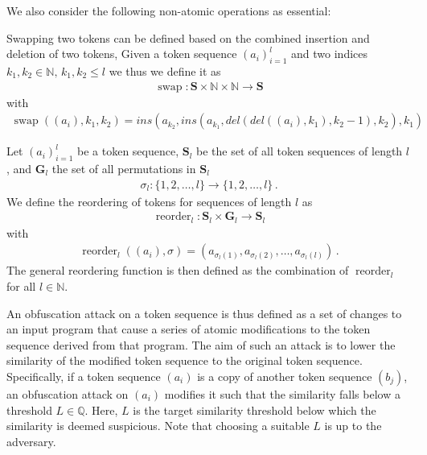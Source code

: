 We also consider the following non-atomic operations as essential:

\begin{theorem}
     Swapping two tokens can be defined based on the combined insertion and deletion of two tokens,
     Given a token sequence \((a_i)_{i=1}^l\) and two indices \(k_1, k_2 \in \mathbb{N},\, k_1, k_2 \leq l \) we thus we define it as
    \begin{align*}
            \operatorname{swap} : \mathbf{S} \times \mathbb{N} \times \mathbb{N} \rightarrow \mathbf{S}
    \end{align*}
    with
    \begin{align*}
        \operatorname{swap}((a_i), k_1, k_2) = {ins}(a_{k_2}, {ins}(a_{k_1}, {del}({del}((a_i), k_1), k_2 - 1), k_2), k_1)
    \end{align*}
\end{theorem}

\begin{theorem}
    Let \((a_i)_{i=1}^l\) be a token sequence, \(\mathbf{S}_l\) be the set of all token sequences of length \(l\), and \(\mathbf{G}_l\) the set of all permutations in \(\mathbf{S}_l\)
    \begin{align*}
        \sigma_l : \{1, 2, \dots, l\} \to \{1, 2, \dots, l\} \,.
    \end{align*}
    We define the reordering of tokens for sequences of length \(l\) as
    \begin{align*}
        \operatorname{reorder}_l : \mathbf{S}_l \times \mathbf{G}_l \rightarrow \mathbf{S}_l
    \end{align*}
    with
    \begin{align*}
        \operatorname{reorder}_l((a_i), \sigma) = (a_{\sigma_l(1)}, a_{\sigma_l(2)}, \dots, a_{\sigma_l(l)}) \,.
    \end{align*}
    The general reordering function is then defined as the combination of \(\operatorname{reorder}_l\) for all \(l \in \mathbb{N}\).
\end{theorem}

An obfuscation attack on a token sequence is thus defined as a set of changes to an input program that cause a series of atomic modifications to the token sequence derived from that program. The aim of such an attack is to lower the similarity of the modified token sequence to the original token sequence. Specifically, if a token sequence \((a_i)\) is a copy of another token sequence \((b_j)\), an obfuscation attack on \((a_i)\) modifies it such that the similarity falls below a threshold \(L \in \mathbb{Q}\).
Here, \(L\) is the target similarity threshold below which the similarity is deemed suspicious. Note that choosing a suitable \(L\) is up to the adversary.

